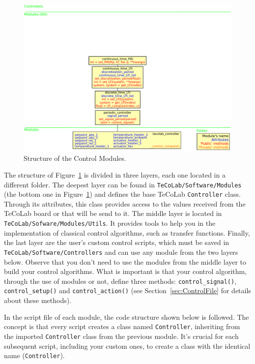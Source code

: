 \documentclass[12pt]{report}
\begin{document}
\begin{figure}[!htbp]
\centering
\includegraphics[scale = 0.55]{Figures/TeCoLabControlToolsDiagram.pdf}
\caption{Structure of the Control Modules.}\label{fig:StructureOfControlModules}
\end{figure}

The structure of Figure~\ref{fig:StructureOfControlModules} is divided in three layers, each one located in a different folder. The deepest layer can be found in \texttt{TeCoLab/Software/Modules} (the bottom one in Figure~\ref{fig:StructureOfControlModules}) and defines the base TeCoLab \texttt{Controller} class. Through its attributes, this class provides access to the values received from the TeCoLab board or that will be send to it. The middle layer is located in \texttt{TeCoLab/Sofware/Modules/Utils}. It provides tools to help you in the implementation of classical control algorithms, such as transfer functions. Finally, the last layer are the user's custom control scripts, which must be saved in \texttt{TeCoLab/Software/Controllers} and can use any module from the two layers below. Observe that you don't need to use the modules from the middle layer to build your control algorithms. What is important is that your control algorithm, through the use of modules or not, define three methods: \texttt{control\_signal()}, \texttt{control\_setup()} and \texttt{control\_action()} (see Section~\ref{sec:ControlFile} for details about these methods).

In the script file of each module, the code structure shown below is followed. The concept is that every script creates a class named \texttt{Controller}, inheriting from the imported \texttt{Controller} class from the previous module. It's crucial for each subsequent script, including your custom ones, to create a class with the identical name (\texttt{Controller}).
\end{document}
